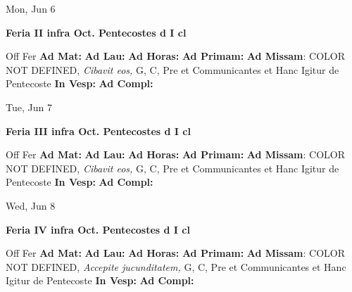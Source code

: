 \documentclass[10pt]{memoir}
\begin{document}
\begin{center}
\begin{minipage}{3.5in}
\vspace{2em}
\begin{center}Mon, Jun 6
\end{center}
\textbf{ \large Feria II infra Oct. Pentecostes
\textnormal{\normalsize d I cl}}

\begin{justify}Off Fer
\textbf{Ad Mat: }
\textbf{Ad Lau: }
\textbf{Ad Horas: }
\textbf{Ad Primam: }\textbf{Ad Missam}: COLOR NOT DEFINED, \textit{Cibavit eos,} G, C, Pre et Communicantes et Hanc Igitur de Pentecoste
\textbf{In Vesp: }
\textbf{Ad Compl: }
\end{justify}
\end{minipage}
\end{center}

\begin{center}
\begin{minipage}{3.5in}
\vspace{2em}
\begin{center}Tue, Jun 7
\end{center}
\textbf{ \large Feria III infra Oct. Pentecostes
\textnormal{\normalsize d I cl}}

\begin{justify}Off Fer
\textbf{Ad Mat: }
\textbf{Ad Lau: }
\textbf{Ad Horas: }
\textbf{Ad Primam: }\textbf{Ad Missam}: COLOR NOT DEFINED, \textit{Cibavit eos,} G, C, Pre et Communicantes et Hanc Igitur de Pentecoste
\textbf{In Vesp: }
\textbf{Ad Compl: }
\end{justify}
\end{minipage}
\end{center}

\begin{center}
\begin{minipage}{3.5in}
\vspace{2em}
\begin{center}Wed, Jun 8
\end{center}
\textbf{ \large Feria IV infra Oct. Pentecostes
\textnormal{\normalsize d I cl}}

\begin{justify}Off Fer
\textbf{Ad Mat: }
\textbf{Ad Lau: }
\textbf{Ad Horas: }
\textbf{Ad Primam: }\textbf{Ad Missam}: COLOR NOT DEFINED, \textit{Accepite jucunditatem,} G, C, Pre et Communicantes et Hanc Igitur de Pentecoste
\textbf{In Vesp: }
\textbf{Ad Compl: }
\end{justify}
\end{minipage}
\end{center}
\end{document}

